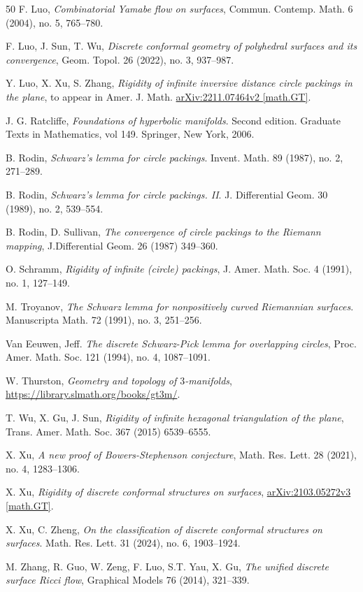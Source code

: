 \documentclass[12pt]{amsart}
\theoremstyle{definition}
\begin{document}
\begin{thebibliography}{50}
 F. Luo, \emph{Combinatorial Yamabe flow on surfaces}, Commun. Contemp. Math. 6 (2004), no. 5, 765--780.

 F. Luo, J. Sun, T. Wu, \emph{Discrete conformal geometry of polyhedral surfaces and its convergence}, Geom. Topol. 26 (2022), no. 3, 937--987.

 Y. Luo, X. Xu, S. Zhang, \emph{Rigidity of infinite inversive distance circle packings in the plane}, to appear in Amer. J. Math. 
\href{https://arxiv.org/abs/2211.07464}{arXiv:2211.07464v2 [math.GT]}.

 J. G. Ratcliffe, \emph{Foundations of hyperbolic manifolds}. Second edition. Graduate Texts in Mathematics, vol 149. Springer, New York, 2006.


 B. Rodin, \emph{Schwarz's lemma for circle packings}. Invent. Math. 89 (1987), no. 2, 271--289.

 B. Rodin, \emph{Schwarz's lemma for circle packings. II}. J. Differential Geom. 30 (1989), no. 2, 539--554.


 B. Rodin, D. Sullivan, \emph{The convergence of circle packings to the Riemann mapping}, J.Differential Geom. 26 (1987) 349--360.

 O. Schramm, \emph{Rigidity of infinite (circle) packings}, J. Amer. Math. Soc. 4 (1991), no. 1, 127--149.



 M. Troyanov, \emph{The Schwarz lemma for nonpositively curved Riemannian surfaces}. Manuscripta Math. 72 (1991), no. 3, 251--256.

 Van Eeuwen, Jeff. \emph{The discrete Schwarz-Pick lemma for overlapping circles},
    Proc. Amer. Math. Soc.   121 (1994), no. 4, 1087--1091.

 W. Thurston, \emph{Geometry and topology of $3$-manifolds}, \href{https://library.slmath.org/books/gt3m/}{https://library.slmath.org/books/gt3m/}.


 T. Wu, X. Gu, J. Sun, \emph{Rigidity of infinite hexagonal triangulation of the plane}, Trans. Amer. Math. Soc. 367 (2015) 6539--6555.

 X. Xu, \emph{A new proof of Bowers-Stephenson conjecture}, Math. Res. Lett. 28 (2021), no. 4, 1283--1306.

 X. Xu,  \emph{Rigidity of discrete conformal structures on surfaces}, \href{https://arxiv.org/abs/2103.05272v3}
    {arXiv:2103.05272v3 [math.GT]}.

 X. Xu, C. Zheng,  \emph{On the classification of discrete conformal structures on surfaces}. Math. Res. Lett. 31 (2024), no. 6, 1903--1924.

 M. Zhang, R. Guo, W. Zeng, F. Luo, S.T. Yau, X. Gu, \emph{The unified discrete surface Ricci flow}, Graphical Models 76 (2014), 321--339.

\end{thebibliography}
\end{document}
